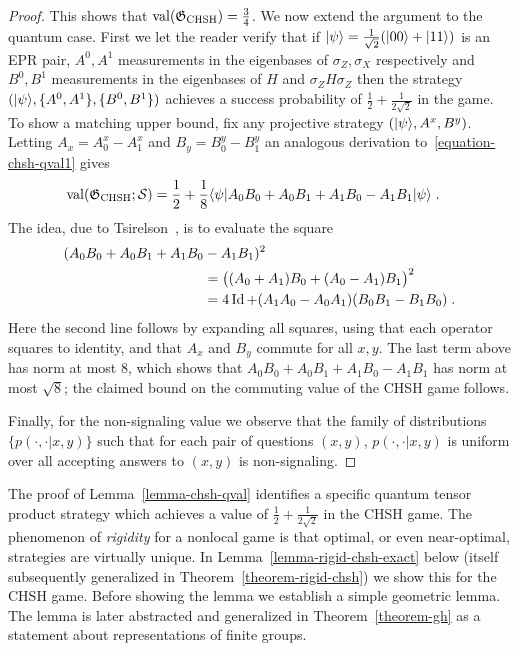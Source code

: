 \begin{proof}
This shows that $\mathrm{val}(\mathfrak{G}_{\mathrm{CHSH}})=\frac{3}{4}$. We now extend the argument to the quantum case. First we let the reader verify that if $|\psi\rangle = \frac{1}{\sqrt{2}} (|00\rangle + |11\rangle)$ is an EPR pair, $A^0, A^1$ measurements in the eigenbases of $\sigma_Z,\sigma_X$ respectively and $B^0,B^1$ measurements in the eigenbases of $H$ and $\sigma_Z H \sigma_Z$ then the strategy $(|\psi\rangle,\{A^0,A^1\},\{B^0,B^1\})$ achieves a success probability of $\frac{1}{2}+\frac{1}{2\sqrt{2}}$ in the game. To show a matching upper bound, fix any projective strategy $(|\psi\rangle, A^x,B^y)$. Letting $A_x = A^x_0-A^x_1$ and  $B_y = B^y_0-B^y_1$ an analogous derivation to~\eqref{equation-chsh-qval1} gives 
\begin{align*}
\mathrm{val}(\mathfrak{G}_{\mathrm{CHSH}};\mathcal{S}) &=\frac{1}{2} + \frac{1}{8}\langle\psi| A_0 B_0 + A_0 B_1 + A_1 B_0 - A_1 B_1 |\psi\rangle\;.
\end{align*}
The idea, due to Tsirelson~\cite{cirel1980quantum}, is to evaluate the square
\begin{align}
(A_0 B_0 + A_0 B_1 + A_1 B_0 &- A_1 B_1 )^2\label{equation-bellop}\\
 &=\big( (A_0+A_1) B_0 + (A_0-A_1) B_1 \big)^2\notag\\
&= 4\mathop{\rm Id}\nolimits + (A_1A_0-A_0A_1) (B_0B_1-B_1B_0)\;.\notag
\end{align}
Here the second line follows by expanding all squares, using that each operator squares to identity, and that $A_x$ and $B_y$ commute for all $x,y$. The last term above has norm at most $8$, which shows that $A_0 B_0 + A_0 B_1 + A_1 B_0 - A_1 B_1 $ has norm at most $\sqrt{8}$; the claimed bound on the commuting value of the CHSH game  follows. 

Finally, for the non-signaling value we observe that the family of distributions $\{p(\cdot,\cdot|x,y)\}$ such that for each pair of questions $(x,y)$, $p(\cdot,\cdot|x,y)$ is uniform over all accepting answers to $(x,y)$ is non-signaling. 
\end{proof}


The proof of Lemma~\ref{lemma-chsh-qval} identifies a specific quantum tensor product strategy which achieves a value of $\frac{1}{2} + \frac{1}{2\sqrt{2}}$ in the CHSH game. The phenomenon of \emph{rigidity} for a nonlocal game is that optimal, or even near-optimal, strategies are virtually unique. In Lemma~\ref{lemma-rigid-chsh-exact} below (itself subsequently generalized in Theorem~\ref{theorem-rigid-chsh}) we show this for the CHSH game. Before showing the lemma we establish a simple geometric lemma. The lemma is later abstracted and generalized  in Theorem~\ref{theorem-gh} as a statement about representations of finite groups. 

